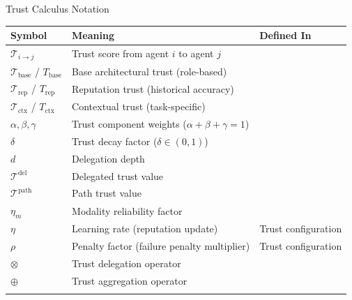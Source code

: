 \documentclass[
  ignorenonframetext,
]{beamer}
\newcounter{none} %
\providecommand{\cref}[1]{\texttt{\detokenize{#1}}}
\begin{document}
\begin{frame}[allowframebreaks]{Trust Calculus Notation}
{\def\LTcaptype{none} %
\begin{longtable}[]{@{}
  >{\raggedright\arraybackslash}p{}
  >{\raggedright\arraybackslash}p{}
  >{\raggedright\arraybackslash}p{}@{}}
\toprule\noalign{}
\begin{minipage}[b]{\linewidth}\raggedright
Symbol
\end{minipage} & \begin{minipage}[b]{\linewidth}\raggedright
Meaning
\end{minipage} & \begin{minipage}[b]{\linewidth}\raggedright
Defined In
\end{minipage} \\
\midrule\noalign{}
\endhead
\(\mathcal{T}_{i \to j}\) & Trust score from agent \(i\) to agent \(j\)
& \cref{def:trust-function} \\
\(\mathcal{T}_{\text{base}}\) / \(T_{\text{base}}\) & Base architectural
trust (role-based) & \cref{tab:trust-components} \\
\(\mathcal{T}_{\text{rep}}\) / \(T_{\text{rep}}\) & Reputation trust
(historical accuracy) & \cref{tab:trust-components} \\
\(\mathcal{T}_{\text{ctx}}\) / \(T_{\text{ctx}}\) & Contextual trust
(task-specific) & \cref{tab:trust-components} \\
\(\alpha, \beta, \gamma\) & Trust component weights
(\(\alpha + \beta + \gamma = 1\)) & \cref{eq:trust-function} \\
\(\delta\) & Trust decay factor (\(\delta \in (0, 1)\)) &
\cref{def:trust-delegation} \\
\(d\) & Delegation depth & \cref{def:trust-delegation} \\
\(\mathcal{T}^{\text{del}}\) & Delegated trust value &
\cref{def:trust-delegation} \\
\(\mathcal{T}^{\text{path}}\) & Path trust value &
\cref{def:path-trust} \\
\(\eta_m\) & Modality reliability factor & \cref{def:modality-trust} \\
\(\eta\) & Learning rate (reputation update) & Trust configuration \\
\(\rho\) & Penalty factor (failure penalty multiplier) & Trust
configuration \\
\(\otimes\) & Trust delegation operator & \cref{def:trust-algebra} \\
\(\oplus\) & Trust aggregation operator & \cref{def:trust-algebra} \\
\bottomrule\noalign{}
\end{longtable}
}
\end{frame}
\end{document}
